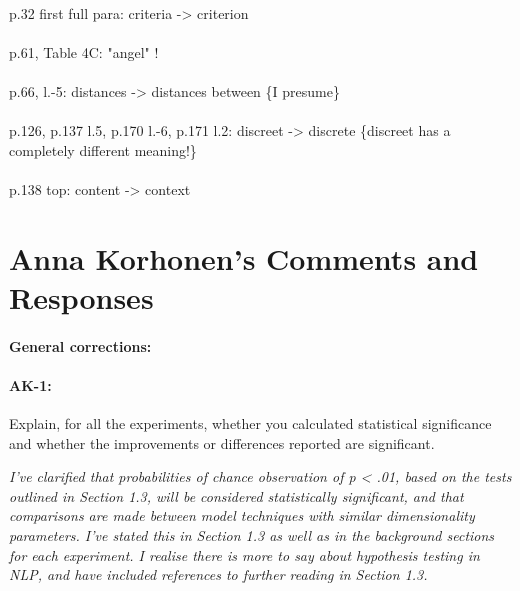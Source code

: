\documentclass[11pt,a4paper]{article}
\newcommand{\res}[1]{\vspace{0.25cm} \begin{adjustwidth}{1cm}{}\emph{#1}\end{adjustwidth}}
\begin{document}
\paragraph{} p.32 first full para:  criteria -> criterion

\paragraph{} p.61, Table 4C: "angel" !

\paragraph{} p.66, l.-5: distances -> distances between \{I presume\}

\paragraph{} p.126,   p.137 l.5,   p.170 l.-6,   p.171 l.2: discreet -> discrete \{discreet has a completely different meaning!\}

\paragraph{} p.138 top: content -> context 


\section{Anna Korhonen's Comments and Responses}

\paragraph{General corrections:}

\paragraph{AK-1:} Explain, for all the experiments, whether you calculated statistical significance and whether the improvements or differences reported are significant.

\res{I've clarified that probabilities of chance observation of p < .01, based on the tests outlined in Section 1.3, will be considered statistically significant, and that comparisons are made between model techniques with similar dimensionality parameters.  I've stated this in Section 1.3 as well as in the background sections for each experiment.  I realise there is more to say about hypothesis testing in NLP, and have included references to further reading in Section 1.3.}
\end{document}

